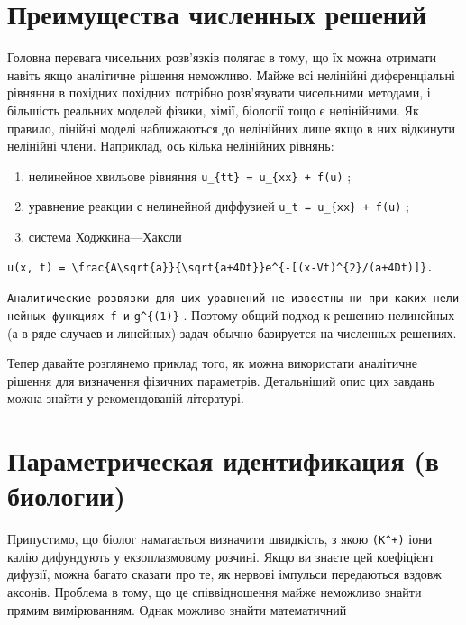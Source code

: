 \documentclass[
  ukrainian,
]{article}
\begin{document}
\section{Преимущества численных
решений}\label{ux43fux440ux435ux438ux43cux443ux449ux435ux441ux442ux432ux430-ux447ux438ux441ux43bux435ux43dux43dux44bux445-ux440ux435ux448ux435ux43dux438ux439-1}

Головна перевага чисельних розв'язків полягає в тому, що їх можна
отримати навіть якщо аналітичне рішення неможливо. Майже всі нелінійні
диференціальні рівняння в похідних похідних потрібно розв'язувати
чисельними методами, і більшість реальних моделей фізики, хімії,
біології тощо є нелінійними. Як правило, лінійні моделі наближаються до
нелінійних лише якщо в них відкинути нелінійні члени. Наприклад, ось
кілька нелінійних рівнянь:

\begin{enumerate}
\def\labelenumi{\arabic{enumi})}
\item
  нелинейное хвильове рівняння \texttt{u\_\{tt\}\ =\ u\_\{xx\}\ +\ f(u)}
  ;
\item
  уравнение реакции с нелинейной диффузией
  \texttt{u\_t\ =\ u\_\{xx\}\ +\ f(u)} ;
\item
  система Ходжкина---Хаксли
\end{enumerate}

\begin{verbatim}
u(x, t) = \frac{A\sqrt{a}}{\sqrt{a+4Dt}}e^{-[(x-Vt)^{2}/(a+4Dt)]}.
\end{verbatim}

\texttt{Аналитические\ розв\textquotesingle{}язки\ для\ цих\ уравнений\ не\ известны\ ни\ при\ каких\ нелинейных\ функциях\ f\ и}
\texttt{g\^{}\{(1)\}} . Поэтому общий подход к решению нелинейных (а в
ряде случаев и линейных) задач обычно базируется на численных решениях.

Тепер давайте розглянемо приклад того, як можна використати аналітичне
рішення для визначення фізичних параметрів. Детальніший опис цих завдань
можна знайти у рекомендованій літературі.

\section{Параметрическая идентификация (в
биологии)}\label{ux43fux430ux440ux430ux43cux435ux442ux440ux438ux447ux435ux441ux43aux430ux44f-ux438ux434ux435ux43dux442ux438ux444ux438ux43aux430ux446ux438ux44f-ux432-ux431ux438ux43eux43bux43eux433ux438ux438}

Припустимо, що біолог намагається визначити швидкість, з якою
\texttt{(K\^{}+)} іони калію дифундують у екзоплазмовому розчині. Якщо
ви знаєте цей коефіцієнт дифузії, можна багато сказати про те, як
нервові імпульси передаються вздовж аксонів. Проблема в тому, що це
співвідношення майже неможливо знайти прямим вимірюванням. Однак можливо
знайти математичний
\end{document}
